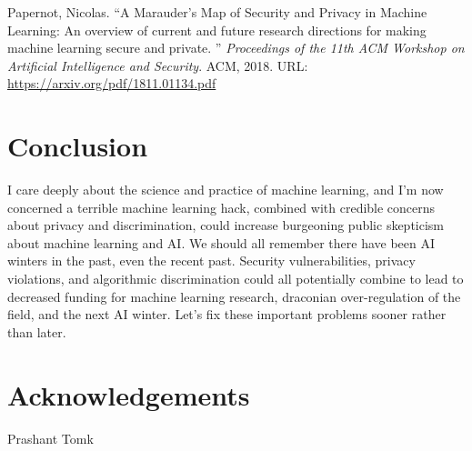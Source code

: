 \documentclass[fleqn]{article}
\begin{document}
\noindent Papernot, Nicolas. ``A Marauder's Map of Security and Privacy in Machine Learning: An overview of current and future research directions for making machine learning secure and private. '' \textit{Proceedings of the 11th ACM Workshop on Artificial Intelligence and Security}. ACM, 2018. URL: \url{https://arxiv.org/pdf/1811.01134.pdf}


\section{Conclusion}

I care deeply about the science and practice of machine learning, and I'm now concerned a terrible machine learning hack, combined with credible concerns about privacy and discrimination, could increase burgeoning public skepticism about machine learning and AI. We should all remember there have been AI winters in the past, even the recent past. Security vulnerabilities, privacy violations, and algorithmic discrimination could all potentially combine to lead to decreased funding for machine learning research, draconian over-regulation of the field, and the next AI winter. Let's fix these important problems sooner rather than later.

\section{Acknowledgements}

Prashant Tomk 
\end{document}
